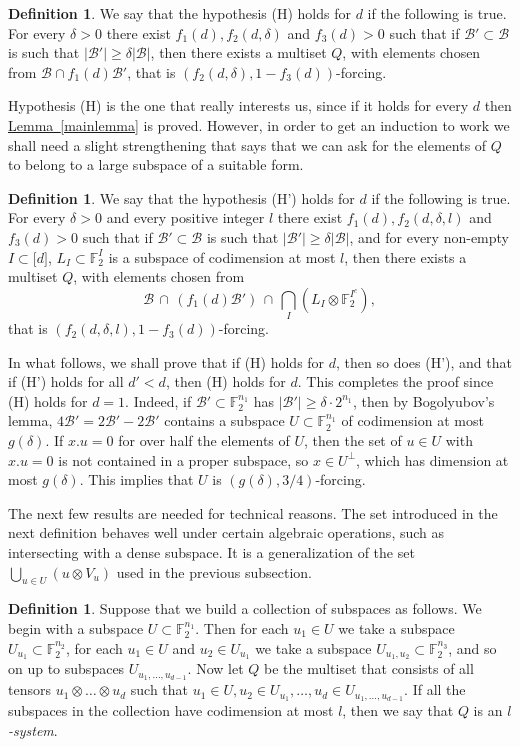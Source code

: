 \documentclass[11pt]{article}
\numberwithin{equation}{section}
\theoremstyle{definition}
\newtheorem{definition}[theorem]{Definition}
\theoremstyle{plain}
\newcommand{\expref}[2]{\hyperref[#2]{#1~\ref{#2}}}
\newcommand\F{\mathbb{F}}
\renewcommand\d{\delta}
\newcommand \cB{\mathcal B}
\newcommand \s{\subset}
\begin{document}
\begin{definition}
	We say that the hypothesis (H) holds for $d$ if the following is true. For every $\d>0$ there exist $f_1(d),f_2(d,\d)$ and $f_3(d)>0$ such that if $\cB'\subset \cB$ is such that $|\cB'|\geq \d|\cB|$, then there exists a multiset $Q$, with elements chosen from $\cB\cap f_1(d)\cB'$, that is $(f_2(d,\d),1-f_3(d))$-forcing.
\end{definition}

Hypothesis (H) is the one that really interests us, since if it holds for every $d$ then \expref{Lemma}{mainlemma} is proved. However, in order to get an induction to work we shall need a slight strengthening that says that we can ask for the elements of $Q$ to belong to a large subspace of a suitable form.

\begin{definition}	
  We say that the hypothesis (H') holds for $d$ if the following is true. For every $\d>0$ and every positive integer $l$ there exist $f_1(d),f_2(d,\d,l)$ and $f_3(d)>0$ such that if $\cB'\subset \cB$ is such that $|\cB'|\geq \d|\cB|$, and for every non-empty $I\subset \lbrack d\rbrack$, $L_I\s \F_2^I$ is a subspace of codimension at most $l$, then there exists a multiset $Q$, with elements chosen from
  \[
    \cB\,\cap\, (f_1(d)\cB')\,\cap\, \bigcap_{I} (L_I\otimes \F_2^{I^c}),
  \]
  that is $(f_2(d,\d,l),1-f_3(d))$-forcing.
\end{definition}

In what follows, we shall prove that if (H) holds for $d$, then so does (H'), and that if (H') holds for all $d'<d$, then (H) holds for $d$. This completes the proof since (H) holds for $d=1$. Indeed, if $\cB'\s \F_2^{n_1}$ has $|\cB'|\geq \d\cdot2^{n_1}$, then by Bogolyubov's lemma, $4\cB'=2\cB'-2\cB'$ contains a subspace $U\s \F_2^{n_1}$ of codimension at most $g(\d)$. If $x.u=0$ for over half the elements of $U$, then the set of $u\in U$ with $x.u=0$ is not contained in a proper subspace, so $x\in U^\perp$, which has dimension at most $g(\d)$. This implies that $U$ is $(g(\d),3/4)$-forcing.

\medskip

The next few results are needed for technical reasons. The set introduced in the next definition behaves well under certain algebraic operations, such as intersecting with a dense subspace. It is a generalization of the set $\bigcup_{u\in U}(u\otimes V_u)$ used in the previous subsection.


\begin{definition} \label{ksystem}
	Suppose that we build a collection of subspaces as follows. We begin with a subspace $U\subset\F_2^{n_1}$. Then for each $u_1\in U$ we take a subspace $U_{u_1}\subset\F_2^{n_2}$, for each $u_1\in U$ and $u_2\in U_{u_1}$ we take a subspace $U_{u_1,u_2}\subset\F_2^{n_3}$, and so on up to subspaces $U_{u_1,\dots,u_{d-1}}$. Now let $Q$ be the multiset that consists of all tensors $u_1\otimes\dots\otimes u_d$ such that $u_1\in U, u_2\in U_{u_1},\dots,u_d\in U_{u_1,\dots,u_{d-1}}$. If all the subspaces in the collection have codimension at most $l$, then we say that $Q$ is an \emph{$l$-system}.
\end{definition}
\end{document}
